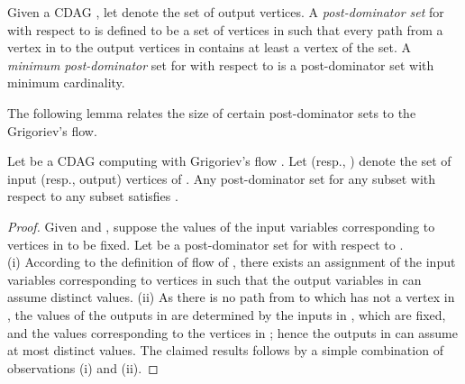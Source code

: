 \documentclass[a4paper,UKenglish]{lipics-v2016}
\begin{document}
\begin{definition}
Given a CDAG , let  denote the set of output vertices. A \emph{post-dominator set} for  with respect to  is defined to be a set of vertices in  such that every path from a vertex in  to the output vertices in  contains at least a vertex of the set.
A \emph{minimum post-dominator} set for  with respect to  is a post-dominator set with minimum cardinality.
\end{definition}

\noindent The following lemma relates the size of certain post-dominator sets to
the Grigoriev's flow.

\begin{lemma}\label{lem:flowpost}
Let  be a CDAG computing  with Grigoriev's flow
. Let  (resp., ) denote the set of input (resp.,
output) vertices of . Any post-dominator set  for any
subset  with respect to any subset 
satisfies .
\end{lemma}
\begin{proof}
Given  and , suppose the values of the
input variables corresponding to vertices in  to be
fixed. Let  be a post-dominator set for  with respect to
.\\ (i) According to the definition of flow of , there exists an
assignment of the input variables corresponding to vertices in 
such that the output variables in  can assume
 distinct values. (ii) As
there is no path from  to  which has not a vertex in ,
the values of the outputs in  are determined by the inputs in
, which are fixed, and the values corresponding to the
vertices in ; hence the outputs in  can assume at most
 distinct values. The claimed results follows
by a simple combination of observations (i) and (ii).
\end{proof}
\end{document}
